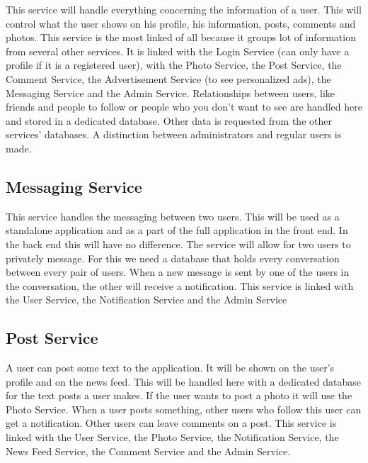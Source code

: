 \documentclass[a4paper,12pt]{article}
\begin{document}
This service will handle everything concerning the information of a user. This will control what the user shows on his profile, his information, posts, comments and photos. This service is the most linked of all because it groups lot of information from several other services. It is linked with the Login Service (can only have a profile if it is a registered user), with the Photo Service, the Post Service, the Comment Service, the Advertisement Service (to see personalized ads), the Messaging Service and the Admin Service. Relationships between users, like friends and people to follow or people who you don't want to see are handled here and stored in a dedicated database. Other data is requested from the other services' databases.
\newline
\newline
A distinction between administrators and regular users is made.

\subsection{Messaging Service}

This service handles the messaging between two users. This will be used as a standalone application and as a part of the full application in the front end. In the back end this will have no difference. The service will allow for two users to privately message. For this we need a database that holds every conversation between every pair of users. When a new message is sent by one of the users in the conversation, the other will receive a notification.
\newline
\newline
This service is linked with the User Service, the Notification Service and the Admin Service

\subsection{Post Service}

A user can post some text to the application. It will be shown on the user's profile and on the news feed. This will be handled here with a dedicated database for the text posts a user makes. If the user wants to post a photo it will use the Photo Service. When a user posts something, other users who follow this user can get a notification. Other users can leave comments on a post.\newline
\newline
This service is linked with the User Service, the Photo Service, the Notification Service, the News Feed Service, the Comment Service and the Admin Service.
\end{document}

